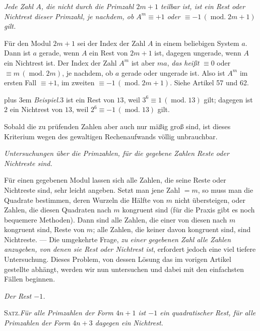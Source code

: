 \emph{Jede Zahl $A$, die nicht durch die Primzahl $2m+1$ teilbar ist, ist ein Rest oder Nichtrest dieser Primzahl, je nachdem, ob $A^m\equiv+1$ oder $\equiv-1\,(\operatorname{mod.}2m+1)$ gilt.}

Für den Modul $2m+1$ sei der Index der Zahl $A$ in einem beliebigen System $a$. Dann ist $a$ gerade, wenn $A$ ein Rest von $2m+1$ ist, dagegen ungerade, wenn $A$ ein Nichtrest ist. Der Index der Zahl $A^m$ ist aber $ma$, \emph{das heißt} $\equiv0$ oder $\equiv m\,(\operatorname{mod.}2m)$, je nachdem, ob $a$ gerade oder ungerade ist. Also ist $A^m$ im ersten Fall $\equiv+1$, im zweiten $\equiv-1\,(\operatorname{mod.}2m+1)$. Siehe Artikel 57 und 62.

{\rightskip=0pt plus 3em
\emph{Beispiel.}\quad $3$ ist ein Rest von $13$, weil $3^6\equiv1\,(\operatorname{mod.}13)$ gilt; dagegen ist $2$ ein Nichtrest von $13$, weil $2^6\equiv-1\,(\operatorname{mod.}13)$ gilt.\par}

Sobald die zu prüfenden Zahlen aber auch nur mäßig groß sind, ist dieses Kriterium wegen des gewaltigen Rechenaufwands völlig unbrauchbar.

\begin{center}\emph{Untersuchungen über die Primzahlen, für die gegebene Zahlen Reste oder Nichtreste sind.}\end{center}

Für einen gegebenen Modul lassen sich alle Zahlen, die seine Reste oder Nichtreste sind, sehr leicht angeben. Setzt man jene Zahl $=m$, so muss man die Quadrate bestimmen, deren Wurzeln die Hälfte von $m$ nicht übersteigen, oder Zahlen, die diesen Quadraten nach $m$ kongruent sind (für die Praxis gibt es noch bequemere Methoden). Dann sind alle Zahlen, die einer von diesen nach $m$ kongruent sind, Reste von $m$; alle Zahlen, die keiner davon kongruent sind, sind Nichtreste. --- Die umgekehrte Frage, \emph{zu einer gegebenen Zahl alle Zahlen anzugeben, von denen sie Rest oder Nichtrest ist}, erfordert jedoch eine viel tiefere Untersuchung. Dieses Problem, von dessen Lösung das im vorigen Artikel gestellte abhängt, werden wir nun untersuchen und dabei mit den einfachsten Fällen beginnen.

\begin{center}\emph{Der Rest $-1$.}\end{center}

\textsc{Satz.}\quad \emph{Für alle Primzahlen der Form $4n+1$ ist $-1$ ein quadratischer Rest, für alle Primzahlen der Form $4n+3$ dagegen ein Nichtrest.}

